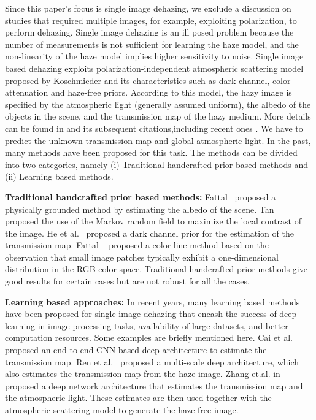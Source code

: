 \documentclass[runningheads]{llncs}
\begin{document}
Since this paper's focus is single image dehazing, we exclude a discussion on studies that required multiple images, for example, exploiting polarization, to perform dehazing. Single image dehazing is an ill posed problem because the number of measurements is not sufficient for learning the haze model, and the non-linearity of the haze model implies higher sensitivity to noise. Single image based dehazing exploits polarization-independent atmospheric scattering model proposed by Koschmieder \cite{koschmieder1925theorie} and its characteristics such as dark channel, color attenuation and haze-free priors. According to this model, the hazy image is specified by the atmospheric light (generally assumed uniform), the albedo of the objects in the scene, and the transmission map of the hazy medium. More details can be found in \cite{koschmieder1925theorie} and its subsequent citations,including recent ones \cite{chen2019multi,vazquez2020physical}. We have to predict the unknown transmission map and  global atmospheric light. In the past, many methods have been proposed for this task. The methods can be divided into two categories, namely (i) Traditional handcrafted prior based methods and (ii) Learning based methods. 

\textbf{Traditional handcrafted prior based methods:} Fattal~\cite{fattal2008single} proposed a physically grounded method by estimating the albedo of the scene. Tan ~\cite{tan2008visibility} proposed the use of the Markov random field to maximize the local contrast of the image. 
He et al.~\cite{he2010single} proposed a dark channel prior for the estimation of the transmission map. Fattal ~\cite{fattal3dehazing} proposed a color-line method based on the observation that small image patches typically exhibit a one-dimensional distribution in the RGB color space. Traditional handcrafted prior methods give good results for certain cases but are not robust for all the cases.

\textbf{Learning based approaches:} In recent years, many learning based methods have been proposed for single image dehazing that encash the success of deep learning in image processing tasks, availability of large datasets, and better computation resources. Some examples are briefly mentioned here. Cai et al.~\cite{cai2016dehazenet} proposed an end-to-end CNN based deep architecture to estimate the transmission map. Ren et al.~\cite{ren2016single} proposed a multi-scale deep architecture, which also estimates the transmission map from the haze image. Zhang et.al. in~\cite{zhang2018densely} proposed a deep network architecture that estimates the transmission map and the atmospheric light. These estimates are then used together with the atmospheric scattering model to generate the haze-free image. 
\end{document}
